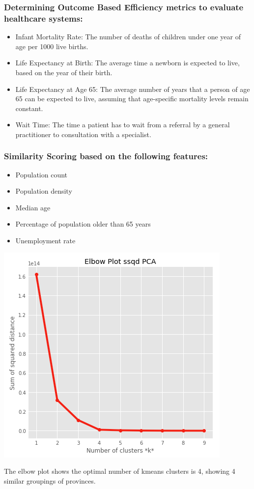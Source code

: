 \documentclass[preprint,12pt]{elsarticle}
\begin{document}
\subsubsection{Determining Outcome Based Efficiency metrics to evaluate healthcare systems:}

\begin{itemize}
    \item Infant Mortality Rate: The number of deaths of children under one year of age per 1000 live births.
    \item Life Expectancy at Birth: The average time a newborn is expected to live, based on the year of their birth.
    \item Life Expectancy at Age 65: The average number of years that a person of age 65 can be expected to live, assuming that age-specific mortality levels remain constant. 
    \item Wait Time: The time a patient has to wait from a referral by a general practitioner to consultation with a specialist.
\end{itemize}


\subsubsection{Similarity Scoring based on the following features:}
\begin{itemize}
    \item Population count
    \item Population density
    \item Median age
    \item Percentage of population older than 65 years
    \item Unemployment rate
\end{itemize}

\begin{center}
    \includegraphics[scale=0.35]{elbow.png}
\end{center}
The elbow plot shows the optimal number of kmeans clusters is 4, showing 4 similar groupings of provinces.
\end{document}
